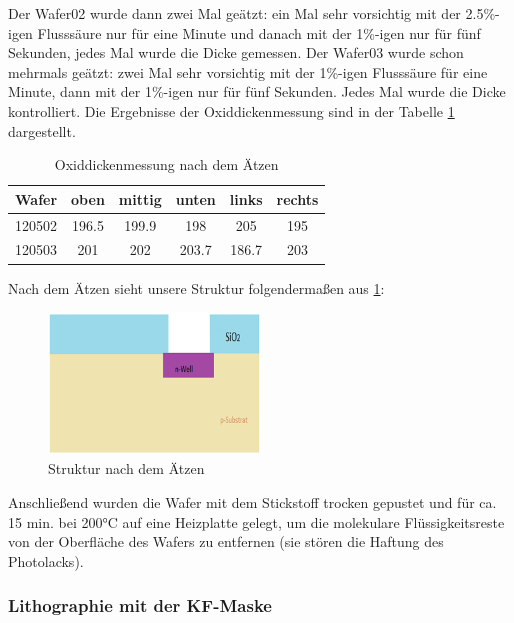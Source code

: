 Der Wafer02 wurde dann zwei Mal geätzt: ein Mal sehr vorsichtig mit der 2.5\%-igen Flusssäure nur für eine Minute und danach mit der 1\%-igen nur für fünf Sekunden, jedes Mal wurde die Dicke gemessen.
Der Wafer03 wurde  schon mehrmals  geätzt: zwei Mal sehr vorsichtig mit der 1\%-igen Flusssäure für eine Minute, dann mit der 1\%-igen nur für fünf Sekunden.  Jedes Mal wurde die Dicke kontrolliert. Die Ergebnisse der Oxiddickenmessung sind in der Tabelle \ref{tab:Oxiddickenmessung nach dem Aetzen} dargestellt.

\begin{table}[H]
\centering
\caption{Oxiddickenmessung nach dem Ätzen}
\begin{tabular}{|c|c|c|c|c|c|}

       \hline
       Wafer  & oben & mittig & unten & links & rechts \\
        \hline
       120502       & 196.5 & 199.9 & 198   & 205 & 195        \\
        \hline
       120503     & 201 & 202   & 203.7 & 186.7 & 203        \\
        \hline

\end{tabular}
\label{tab:Oxiddickenmessung nach dem Aetzen}
\end{table}

Nach dem Ätzen sieht unsere Struktur folgendermaßen aus \ref{fig:StrukturnachdemAetzen}:

\begin{figure}[H]
    \centering
        \includegraphics[width=0.5\textwidth]{bilder/StrukturnachdemAetzen.png}
    \caption{Struktur nach dem Ätzen}
    \label{fig:StrukturnachdemAetzen}
\end{figure}
Anschließend wurden die Wafer mit dem Stickstoff trocken gepustet und für ca. 15 min. bei 200°C auf eine Heizplatte gelegt, um die molekulare Flüssigkeitsreste von der Oberfläche des Wafers zu entfernen (sie stören die Haftung des Photolacks).




\subsubsection[Lithographie mit der KF-Maske]{Lithographie mit der KF-Maske }

